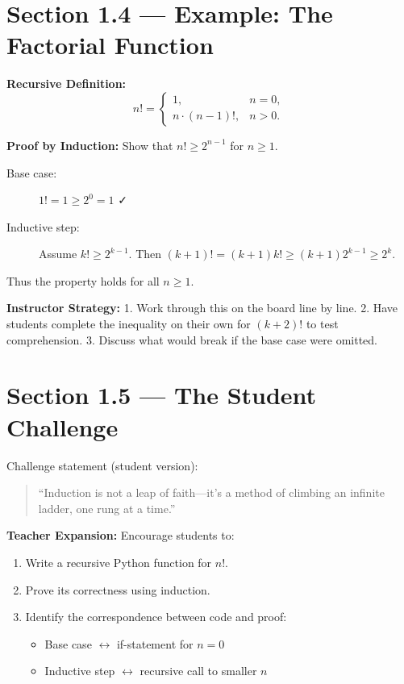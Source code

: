 \section{Section 1.4 — Example: The Factorial Function}
\textbf{Recursive Definition:}
\[
n! =
\begin{cases}
1, & n = 0,\\
n \cdot (n - 1)!, & n > 0.
\end{cases}
\]

\textbf{Proof by Induction:}  Show that $n! \ge 2^{n-1}$ for $n \ge 1$.

\begin{description}
  \item[Base case:] $1! = 1 \ge 2^{0} = 1$ ✓
  \item[Inductive step:] Assume $k! \ge 2^{k-1}$.
  Then $(k+1)! = (k+1)k! \ge (k+1)2^{k-1} \ge 2^{k}$.
\end{description}
Thus the property holds for all $n \ge 1$.

\textbf{Instructor Strategy:}
1. Work through this on the board line by line.  
2. Have students complete the inequality on their own for $(k+2)!$ to test comprehension.  
3. Discuss what would break if the base case were omitted.

\section{Section 1.5 — The Student Challenge}
Challenge statement (student version):
\begin{quote}
“Induction is not a leap of faith—it’s a method of climbing an infinite ladder, one rung at a time.”
\end{quote}

\textbf{Teacher Expansion:}
Encourage students to:
\begin{enumerate}
  \item Write a recursive Python function for $n!$.
  \item Prove its correctness using induction.
  \item Identify the correspondence between code and proof:
  \begin{itemize}
    \item Base case $\leftrightarrow$ if-statement for $n=0$
    \item Inductive step $\leftrightarrow$ recursive call to smaller $n$
  \end{itemize}
\end{enumerate}

